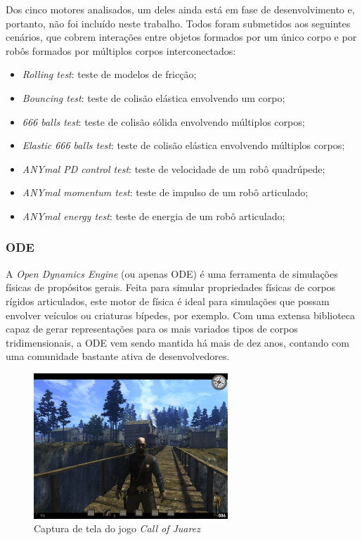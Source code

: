 \documentclass[cic,tc]{iiufrgs}
\begin{document}
Dos cinco motores analisados, um deles ainda está em fase de desenvolvimento e,
portanto, não foi incluído neste trabalho. Todos foram submetidos aos seguintes
cenários, que cobrem interações entre objetos formados por um único corpo e por
robôs formados por múltiplos corpos interconectados:

\begin{itemize}
  \item \textit{Rolling test}: teste de modelos de fricção;
  \item \textit{Bouncing test}: teste de colisão elástica envolvendo um corpo;
  \item \textit{666 balls test}: teste de colisão sólida envolvendo múltiplos
  corpos;
  \item \textit{Elastic 666 balls test}: teste de colisão elástica envolvendo
  múltiplos corpos;
  \item \textit{ANYmal PD control test}: teste de velocidade de um robô
  quadrúpede;
  \item \textit{ANYmal momentum test}: teste de impulso de um robô articulado;
  \item \textit{ANYmal energy test}: teste de energia de um robô articulado;
\end{itemize}



\subsubsection{ODE}
A \textit{Open Dynamics Engine} (ou apenas ODE) é uma ferramenta de simulações
físicas de propósitos gerais. Feita para simular propriedades físicas de corpos
rígidos articulados, este motor de física é ideal para simulações que possam
envolver veículos ou criaturas bípedes, por exemplo. Com uma extensa biblioteca
capaz de gerar representações para os mais variados tipos de corpos
tridimensionais, a ODE vem sendo mantida há mais de dez anos, contando com uma
comunidade bastante ativa de desenvolvedores.

\begin{figure}
    \caption{Captura de tela do jogo \textit{Call of Juarez}}
    \begin{center}
      \includegraphics[width=0.65\textwidth]{call_of_juarez.png}
    \end{center}
    \label{fig:call_of_juarez}
\end{figure}
\end{document}
